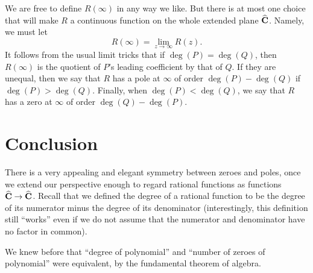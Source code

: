 \documentclass[twocolumn,12pt]{article}
\begin{document}
We are free to define $R(\infty)$ in any way we like. But there is at most one choice that will make $R$ a continuous function on the whole extended plane $\widehat{\mathbf{C}}$. Namely, we must let 
\[
  R(\infty) = \lim_{z \to \infty} R(z).
\]
It follows from the usual limit tricks that if $\deg{(P)} = \deg{(Q)}$, then $R(\infty)$ is the quotient of $P$'s leading coefficient by that of $Q$. If they are unequal, then we say that $R$ has a pole at $\infty$ of order $\deg{(P)} - \deg{(Q)}$ if $\deg{(P)} > \deg{(Q)}$. Finally, when $\deg{(P)} < \deg{(Q)}$, we say that $R$ has a zero at $\infty$ of order $\deg{(Q)} - \deg{(P)}$.

\section{Conclusion}

There is a very appealing and elegant symmetry between zeroes and poles, once we extend our perspective enough to regard rational functions as functions $\widehat{\mathbf{C}} \to \widehat{\mathbf{C}}$. Recall that we defined the degree of a rational function to be the degree of its numerator minus the degree of its denominator (interestingly, this definition still ``works'' even if we do not assume that the numerator and denominator have no factor in common).

We knew before that ``degree of polynomial'' and ``number of zeroes of polynomial'' were equivalent, by the fundamental theorem of algebra. 
\end{document}
